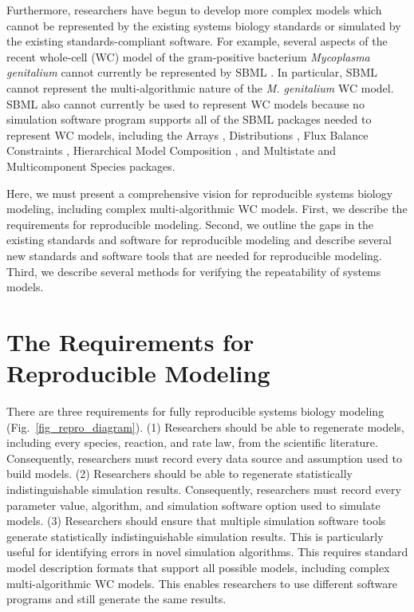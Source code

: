 \documentclass[journal,transmag,twoside]{IEEEtran}
\begin{document}
Furthermore, researchers have begun to develop more complex models which cannot be represented by the existing systems biology standards or simulated by the existing standards-compliant software. For example, several aspects of the recent whole-cell (WC) model of the gram-positive bacterium \textit{Mycoplasma genitalium} \cite{Karr2012} cannot currently be represented by SBML \cite{Waltemath2016}. In particular, SBML cannot represent the multi-algorithmic nature of the \textit{M. genitalium} WC model. SBML also cannot currently be used to represent WC models because no simulation software program supports all of the SBML packages needed to represent WC models, including the Arrays \cite{watanabe2016efficient}, Distributions \cite{Moodie2015}, Flux Balance Constraints \cite{olivier2015fbc}, Hierarchical Model Composition \cite{smith2015sbml}, and Multistate and Multicomponent Species \cite{SBMLMulti} packages.

Here, we must present a comprehensive vision for reproducible systems biology modeling, including complex multi-algorithmic WC models. First, we describe the requirements for reproducible modeling. Second, we outline the gaps in the existing standards and software for reproducible modeling and describe several new standards and software tools that are needed for reproducible modeling. Third, we describe several methods for verifying the repeatability of systems models.

\section{The Requirements for Reproducible Modeling}

There are three requirements for fully reproducible systems biology modeling (Fig.~\ref{fig_repro_diagram}). (1) Researchers should be able to regenerate models, including every species, reaction, and rate law, from the scientific literature. Consequently, researchers must record every data source and assumption used to build models. (2) Researchers should be able to regenerate statistically indistinguishable simulation results. Consequently, researchers must record every parameter value, algorithm, and simulation software option used to simulate models. (3) Researchers should ensure that multiple simulation software tools generate statistically indistinguishable simulation results. This is particularly useful for identifying errors in novel simulation algorithms. This requires standard model description formats that support all possible models, including complex multi-algorithmic WC models. This enables researchers to use different software programs and still generate the same results.
\end{document}
